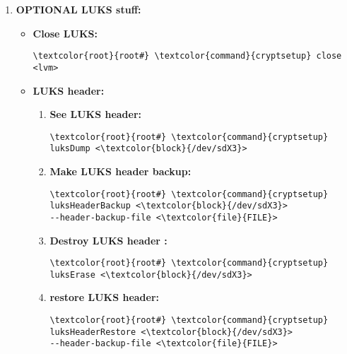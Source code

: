 \documentclass[10pt, a4paper, onecolumn, openany]{book} %
\begin{document}
\begin{enumerate}
    \item \textbf{OPTIONAL LUKS stuff:}
    \begin{itemize}
        \item \textbf{Close LUKS:}
\begin{Verbatim}[commandchars=\\\{\}]
\textcolor{root}{root#} \textcolor{command}{cryptsetup} close <lvm>
\end{Verbatim}
\item \textbf{LUKS header:}
        \begin{enumerate}
            \item \textbf{See LUKS header:}
\begin{Verbatim}[commandchars=\\\{\}]
\textcolor{root}{root#} \textcolor{command}{cryptsetup} luksDump <\textcolor{block}{/dev/sdX3}>
\end{Verbatim}
            \item \textbf{Make LUKS header backup:}
\begin{Verbatim}[commandchars=\\\{\}]
\textcolor{root}{root#} \textcolor{command}{cryptsetup} luksHeaderBackup <\textcolor{block}{/dev/sdX3}> 
--header-backup-file <\textcolor{file}{FILE}>
\end{Verbatim}
            \item \textbf{Destroy LUKS header :}
\begin{Verbatim}[commandchars=\\\{\}]
\textcolor{root}{root#} \textcolor{command}{cryptsetup} luksErase <\textcolor{block}{/dev/sdX3}>
\end{Verbatim}
            \item \textbf{restore LUKS header:}
\begin{Verbatim}[commandchars=\\\{\}]
\textcolor{root}{root#} \textcolor{command}{cryptsetup} luksHeaderRestore <\textcolor{block}{/dev/sdX3}> 
--header-backup-file <\textcolor{file}{FILE}>
\end{Verbatim}
        \end{enumerate}
    \end{itemize}


\end{enumerate}
\end{document}

